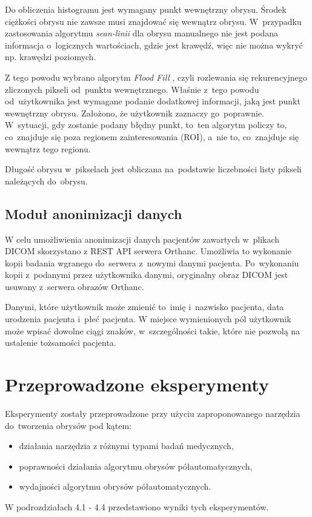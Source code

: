 \documentclass[a4paper,11pt,twoside,openright]{report}
\newcommand\blankpage{%
    \null
    \thispagestyle{empty}%
    \newpage}
\theoremstyle{definition}
\begin{document}
Do obliczenia histogramu jest wymagany punkt wewnętrzny obrysu. Środek ciężkości
obrysu nie zawsze musi znajdować się wewnątrz obrysu. W~przypadku zastosowania
algorytmu \textit{scan-linii} \cite{GK1} dla obrysu manualnego nie jest podana informacja o~logicznych
wartościach, gdzie jest krawędź, więc nie można wykryć np. krawędzi poziomych.

\pagebreak

Z tego powodu wybrano algorytm \textit{Flood Fill} \cite{AiSD2}, czyli rozlewania się rekurencyjnego
zliczonych pikseli od~punktu wewnętrznego. Właśnie z~tego powodu od~użytkownika
jest wymagane podanie dodatkowej informacji, jaką jest punkt wewnętrzny obrysu.
Założono, że użytkownik zaznaczy go~poprawnie. W~sytuacji, gdy zostanie podany
błędny punkt, to~ten algorytm policzy to, co~znajduje się poza regionem zainteresowania (ROI),
a~nie to, co~znajduje się wewnątrz tego regionu.

Długość obrysu w~pikselach jest obliczana na~podstawie liczebności listy pikseli należących do~obrysu.

\section {Moduł anonimizacji danych}

W celu umożliwienia anonimizacji danych pacjentów zawartych w~plikach DICOM skorzystano
z REST API serwera Orthanc. Umożliwia to wykonanie kopii badania wgranego do~serwera
z~nowymi danymi pacjenta. Po~wykonaniu kopii z~podanymi przez użytkownika danymi,
oryginalny obraz DICOM jest usuwany z~serwera obrazów Orthanc.

Danymi, które użytkownik może zmienić to~imię i~nazwisko pacjenta, data urodzenia pacjenta
i~płeć pacjenta. W miejsce wymienionych pól użytkownik może wpisać dowolne ciągi
znaków, w~szczególności takie, które nie pozwolą na ustalenie tożsamości pacjenta.

\afterpage{\blankpage}

\chapter {Przeprowadzone eksperymenty}

Eksperymenty zostały przeprowadzone przy użyciu zaproponowanego narzędzia
do~tworzenia obrysów pod kątem:
\begin{itemize}[noitemsep]
\item działania narzędzia z różnymi typami badań medycznych,
\item poprawności działania algorytmu obrysów półautomatycznych,
\item wydajności algorytmu obrysów półautomatycznych.
\end{itemize}
W podrozdziałach 4.1 - 4.4 przedstawiono wyniki tych eksperymentów.
\end{document}
